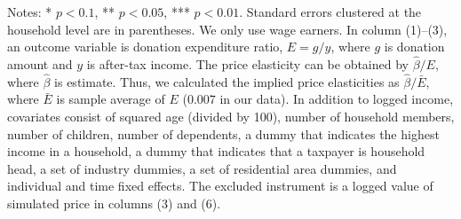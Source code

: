 \begin{table}
\begin{threeparttable}
\begin{tablenotes}
\item Notes: * $p < 0.1$, ** $p < 0.05$, *** $p < 0.01$. Standard errors clustered at the household level are in parentheses. We only use wage earners. In column (1)--(3), an outcome variable is donation expenditure ratio, $E = g/y$, where $g$ is donation amount and $y$ is after-tax income. The price elasticity can be obtained by $\hat{\beta}/E$, where $\hat{\beta}$ is estimate. Thus, we calculated the implied price elasticities as $\hat{\beta}/\bar{E}$, where $\bar{E}$ is sample average of $E$ ($0.007$ in our data). In addition to logged income, covariates consist of squared age (divided by 100), number of household members, number of children, number of dependents, a dummy that indicates the highest income in a household, a dummy that indicates that a taxpayer is household head, a set of industry dummies, a set of residential area dummies, and individual and time fixed effects. The excluded instrument is a logged value of simulated price in columns (3) and (6).
\end{tablenotes}
\end{threeparttable}
\end{table}
